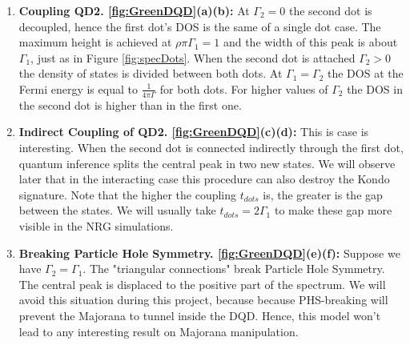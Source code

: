 \begin{enumerate}
    \item \textbf{Coupling QD2. \ref{fig:GreenDQD}(a)(b):}  At $\Gamma_2=0$  the second dot is decoupled, hence the first dot's DOS is the same of a single dot case. The maximum height is achieved at  $\rho \pi \Gamma_1 =1$ and the width of this peak is about  $\Gamma_1$, just as in Figure \ref{fig:specDots}. When the second dot is attached $\Gamma_2 >0$ the density of states is divided between both dots. At $\Gamma_1 = \Gamma_2$ the DOS at the Fermi energy is equal to $\frac{1}{4\pi\Gamma}$ for both dots. For higher values of $\Gamma_2$ the DOS in the second dot is higher than in the first one.  
    
 

    \item \textbf{Indirect Coupling of QD2. \ref{fig:GreenDQD}(c)(d):} This is case is interesting. When the second dot is connected indirectly through the first dot, quantum inference splits the central peak in two new states. We will observe later that in the interacting case this procedure can also destroy the Kondo signature. Note that the higher the coupling $t_{dots}$ is, the greater is the gap between the states. We will usually take $t_{dots} = 2\Gamma_1$ to make these gap more visible in the NRG simulations. 
    \item \textbf{Breaking Particle Hole Symmetry. \ref{fig:GreenDQD}(e)(f):}
    Suppose we have $\Gamma_2 = \Gamma_1$. The "triangular connections" break Particle Hole Symmetry. The central peak is displaced to the positive part of the spectrum. We will avoid this situation during this project, because because PHS-breaking  will prevent the Majorana to tunnel inside the DQD. Hence, this model won't lead to any interesting result on Majorana manipulation. 
\end{enumerate}



    














